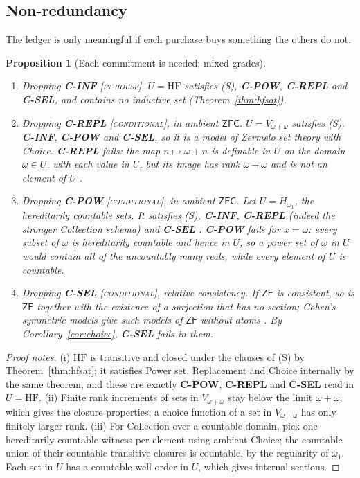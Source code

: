 \documentclass[11pt]{article}
\newcommand{\HF}{\mathrm{HF}}                 \newcommand{\rank}{\operatorname{rank}}
\newcommand{\gradetag}[1]{\textnormal{\textsc{[#1]}}}
\newcommand{\inhouse}{\gradetag{in-house}}
\newcommand{\condg}{\gradetag{conditional}}
\newtheorem{proposition}[theorem]{Proposition}
\theoremstyle{definition}
\begin{document}
\subsection{Non-redundancy}\label{ssec:nonredundancy}

The ledger is only meaningful if each purchase buys something the others do not.

\begin{proposition}[Each commitment is needed; mixed grades]\label{prop:nonredundancy}
\begin{enumerate}[label=\textup{(\roman*)}]
\item \emph{Dropping \textbf{C-INF}} \inhouse. $U=\HF$ satisfies (S), \textbf{C-POW},
\textbf{C-REPL} and \textbf{C-SEL}, and contains no inductive set (Theorem~\ref{thm:hfsat}).
\item \emph{Dropping \textbf{C-REPL}} \condg, in ambient $\mathsf{ZFC}$. $U=V_{\omega+\omega}$
satisfies (S), \textbf{C-INF}, \textbf{C-POW} and \textbf{C-SEL}, so it is a model of Zermelo set
theory with Choice. \textbf{C-REPL} fails: the map $n\mapsto\omega+n$ is definable in $U$ on the
domain $\omega\in U$, with each value in $U$, but its image has rank $\omega+\omega$ and is not an
element of $U$ \citep[Ch.~12]{Jech2003}.
\item \emph{Dropping \textbf{C-POW}} \condg, in ambient $\mathsf{ZFC}$. Let $U=H_{\omega_1}$, the
hereditarily countable sets. It satisfies (S), \textbf{C-INF}, \textbf{C-REPL} (indeed the stronger
Collection schema) and \textbf{C-SEL} \citep{GitmanHamkinsJohnstone2016}. \textbf{C-POW} fails for
$x=\omega$: every subset of $\omega$ is hereditarily countable and hence in $U$, so a power set of
$\omega$ in $U$ would contain all of the uncountably many reals, while every element of $U$ is
countable.
\item \emph{Dropping \textbf{C-SEL}} \condg, relative consistency. If $\mathsf{ZF}$ is consistent,
so is $\mathsf{ZF}$ together with the existence of a surjection that has no section; Cohen's
symmetric models give such models of $\mathsf{ZF}$ without atoms \citep{Cohen1966,Jech1973}. By
Corollary~\ref{cor:choice}, \textbf{C-SEL} fails in them.
\end{enumerate}
\end{proposition}

\begin{proof}[Proof notes]
(i) $\HF$ is transitive and closed under the clauses of (S) by Theorem~\ref{thm:hfsat}; it
satisfies Power set, Replacement and Choice internally by the same theorem, and these are exactly
\textbf{C-POW}, \textbf{C-REPL} and \textbf{C-SEL} read in $U=\HF$. (ii) Finite rank increments of
sets in $V_{\omega+\omega}$ stay below the limit $\omega+\omega$, which gives the closure
properties; a choice function of a set in $V_{\omega+\omega}$ has only finitely larger rank. (iii)
For Collection over a countable domain, pick one hereditarily countable witness per element using
ambient Choice; the countable union of their countable transitive closures is countable, by the
regularity of $\omega_1$. Each set in $U$ has a countable well-order in $U$, which gives internal
sections.
\end{proof}
\end{document}
